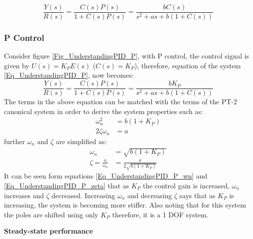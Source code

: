 \begin{equation}\label{Eq_UnderstandingPID_P}
	\frac{Y(s)}{R(s)} = \frac{C(s)P(s)}{1 + C(s)P(s)} = \frac{b C(s)}{s^2 + as + b(1 + C(s))}
\end{equation}

\subsubsection{P Control}

Consider figure \ref{Fig_UnderstandingPID_P}, with P control, the control signal is given by $U(s) = K_P E(s)$ ($C(s) = K_P$), therefore, equation of the system \eqref{Eq_UnderstandingPID_P}, now becomes:
\begin{equation}
	\frac{Y(s)}{R(s)} = \frac{C(s)P(s)}{1 + C(s)P(s)} = \frac{b K_P}{s^2 + as + b(1 + C(s))}
\end{equation}
The terms in the above equation can be matched with the terms of the PT-2 canonical system in order to derive the system properties such as:
\begin{align}
	\omega_{n}^2 &= b(1 + K_P) \\
	2 \zeta \omega_{n} &= a
\end{align}
further $\omega_{n}$ and $\zeta$ are simplified as:
\begin{align}
	\omega_{n} &= \sqrt{b(1 + K_P)} \label{Eq_UnderstandingPID_P_wn} \\
	\zeta = \frac{a}{\omega_{n}} &= \frac{a}{2 \sqrt{b(1 + K_P)}} \label{Eq_UnderstandingPID_P_zeta}
\end{align}
It can be seen form equations \eqref{Eq_UnderstandingPID_P_wn} and \eqref{Eq_UnderstandingPID_P_zeta} that as $K_P$ the control gain is increased, $\omega_{n}$ increases and $\zeta$ decreased. Increasing $\omega_{n}$ and decreasing $\zeta$ says that as $K_P$ is increasing, the system is becoming more stiffer. Also noting that for this system the poles are shifted using only $K_P$ therefore, it is a 1 DOF system.

\textbf{Steady-state performance}

